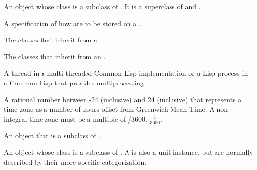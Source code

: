 \documentclass[10pt,twoside,english,pdftex]{article}
\begin{document}
\begin{glossary-list}

%
An object whose class is a subclass of 
\textbf{}. It is a superclass of
\textbf{} and
\textbf{}.


%
%
A specification of how  are to be stored on a
.


\glent[subclasses]
%
%
The classes that inherit from a .


\glent[subevents]
%
The classes that inherit from an .


\glent[thread] 
%
%
A thread in a multi-threaded Common Lisp implementation or a Lisp process in a
Common Lisp that provides multiprocessing.


%
A rational number between -24 (inclusive) and 24 (inclusive) that represents a
time zone as a number of hours offset from Greenwich Mean Time. A non-integral
time zone must be a multiple of 
%
/3600.  
\T$\frac{1}{3600}$.


%
%
%
%
%
An object that is a subclass of \textbf{}.


%
%
%
%
%
An object whose class is a subclass of
\textbf{}. A  is
also a unit instance, but  are normally described by
their more specific categorization.


\end{glossary-list}
\end{document}
